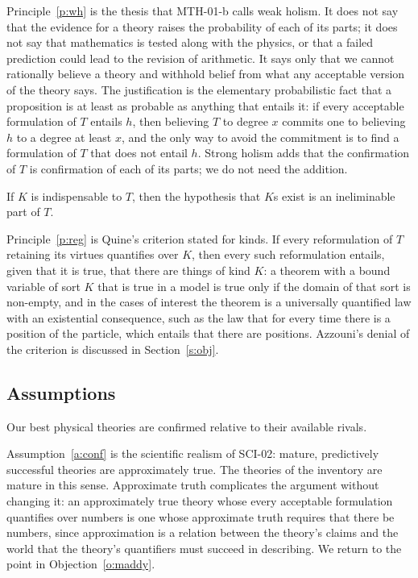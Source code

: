\documentclass{situationist-preprint}
\begin{document}
Principle~\ref{p:wh} is the thesis that MTH-01-b calls weak holism. It does not say that the evidence for a theory raises the probability of each of its parts; it does not say that mathematics is tested along with the physics, or that a failed prediction could lead to the revision of arithmetic. It says only that we cannot rationally believe a theory and withhold belief from what any acceptable version of the theory says. The justification is the elementary probabilistic fact that a proposition is at least as probable as anything that entails it: if every acceptable formulation of $T$ entails $h$, then believing $T$ to degree $x$ commits one to believing $h$ to a degree at least $x$, and the only way to avoid the commitment is to find a formulation of $T$ that does not entail $h$. Strong holism adds that the confirmation of $T$ is confirmation of each of its parts; we do not need the addition.

\begin{principle}[Regimentation]\label{p:reg}
If $K$ is indispensable to $T$, then the hypothesis that $K$s exist is an ineliminable part of $T$.
\end{principle}

Principle~\ref{p:reg} is Quine's criterion stated for kinds. If every reformulation of $T$ retaining its virtues quantifies over $K$, then every such reformulation entails, given that it is true, that there are things of kind $K$: a theorem with a bound variable of sort $K$ that is true in a model is true only if the domain of that sort is non-empty, and in the cases of interest the theorem is a universally quantified law with an existential consequence, such as the law that for every time there is a position of the particle, which entails that there are positions. Azzouni's denial of the criterion is discussed in Section~\ref{s:obj}.

\subsection{Assumptions}

\begin{assumption}[Confirmation]\label{a:conf}
Our best physical theories are confirmed relative to their available rivals.
\end{assumption}

Assumption~\ref{a:conf} is the scientific realism of SCI-02: mature, predictively successful theories are approximately true. The theories of the inventory are mature in this sense. Approximate truth complicates the argument without changing it: an approximately true theory whose every acceptable formulation quantifies over numbers is one whose approximate truth requires that there be numbers, since approximation is a relation between the theory's claims and the world that the theory's quantifiers must succeed in describing. We return to the point in Objection~\ref{o:maddy}.
\end{document}
